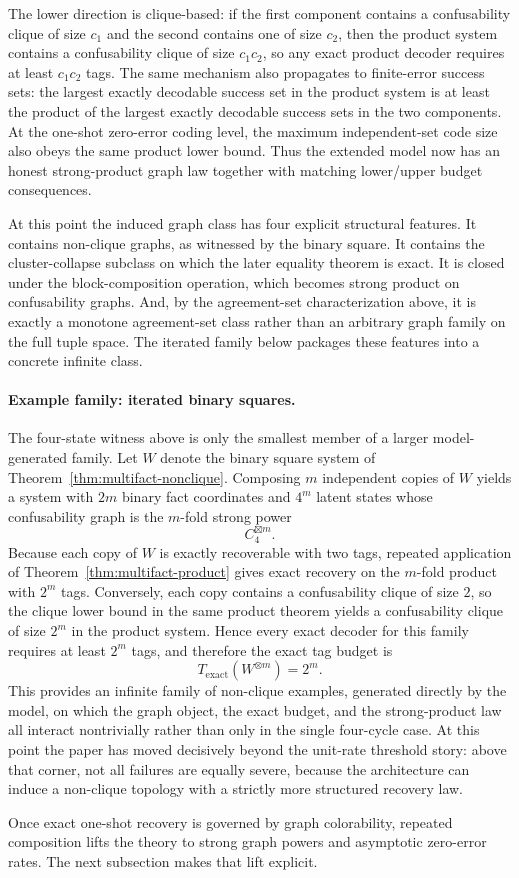 The lower direction is clique-based: if the first component contains a confusability clique of size $c_1$ and the second contains one of size $c_2$, then the product system contains a confusability clique of size $c_1c_2$, so any exact product decoder requires at least $c_1c_2$ tags. The same mechanism also propagates to finite-error success sets: the largest exactly decodable success set in the product system is at least the product of the largest exactly decodable success sets in the two components. At the one-shot zero-error coding level, the maximum independent-set code size also obeys the same product lower bound. Thus the extended model now has an honest strong-product graph law together with matching lower/upper budget consequences.

At this point the induced graph class has four explicit structural features. It contains non-clique graphs, as witnessed by the binary square. It contains the cluster-collapse subclass on which the later equality theorem is exact. It is closed under the block-composition operation, which becomes strong product on confusability graphs. And, by the agreement-set characterization above, it is exactly a monotone agreement-set class rather than an arbitrary graph family on the full tuple space. The iterated family below packages these features into a concrete infinite class.

\paragraph{Example family: iterated binary squares.}
The four-state witness above is only the smallest member of a larger model-generated family. Let $W$ denote the binary square system of Theorem~\ref{thm:multifact-nonclique}. Composing $m$ independent copies of $W$ yields a system with $2m$ binary fact coordinates and $4^m$ latent states whose confusability graph is the $m$-fold strong power
\[
C_4^{\boxtimes m}.
\]
Because each copy of $W$ is exactly recoverable with two tags, repeated application of Theorem~\ref{thm:multifact-product} gives exact recovery on the $m$-fold product with $2^m$ tags. Conversely, each copy contains a confusability clique of size $2$, so the clique lower bound in the same product theorem yields a confusability clique of size $2^m$ in the product system. Hence every exact decoder for this family requires at least $2^m$ tags, and therefore the exact tag budget is
\[
T_{\mathrm{exact}}(W^{\otimes m}) = 2^m.
\]
This provides an infinite family of non-clique examples, generated directly by the model, on which the graph object, the exact budget, and the strong-product law all interact nontrivially rather than only in the single four-cycle case. At this point the paper has moved decisively beyond the unit-rate threshold story: above that corner, not all failures are equally severe, because the architecture can induce a non-clique topology with a strictly more structured recovery law. 

Once exact one-shot recovery is governed by graph colorability, repeated composition lifts the theory to strong graph powers and asymptotic zero-error rates. The next subsection makes that lift explicit.
